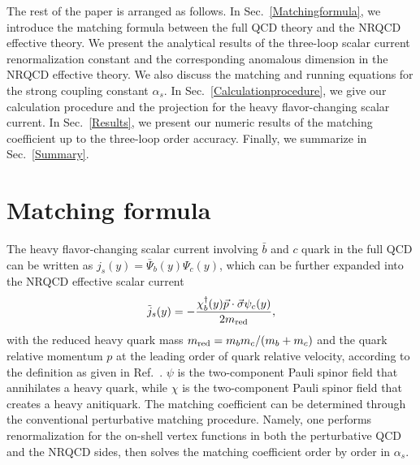 \documentclass[onecolumn,preprintnumbers,aps,superscriptaddress,nofootinbib,prd,notitlepage]{revtex4-1}
\newcommand{\beq}{\begin{eqnarray}}
\newcommand{\eeq}{\end{eqnarray}}
\begin{document}
The rest of the paper is arranged as follows.
In Sec.~\ref{Matchingformula}, we introduce the matching formula between the full QCD theory and the NRQCD effective theory.  We  present the analytical results of  the three-loop  scalar current renormalization constant and the corresponding anomalous dimension in the NRQCD effective theory. We also discuss the matching and running equations for the strong coupling constant $\alpha_{s}$.
In Sec.~\ref{Calculationprocedure},  we give our calculation procedure and the projection for the heavy flavor-changing scalar current.
In Sec.~\ref{Results}, we present our numeric results of the matching coefficient up to the three-loop order accuracy. Finally, we summarize  in Sec.~\ref{Summary}.



\section{Matching formula ~\label{Matchingformula}}

The heavy flavor-changing scalar current involving $\bar{b}$ and $c$ quark in the full QCD can be written as $j_s(y)=\bar{\Psi}_b(y) \Psi_c(y)$, which can be further expanded into the NRQCD effective scalar current
\beq
\tilde{j}_s(y)=-\frac{\chi^\dag_b(y) \vec{p}\cdot \vec{\sigma}\psi_c(y)}{2m_{\rm red}},
\eeq
with the reduced heavy quark mass $m_{\rm red}=m_b m_c/(m_b+m_c)$ and the quark relative momentum $p$ at the leading order of quark relative velocity, according
to the definition as given  in Ref.~\cite{Kniehl:2006qw}. $\psi$ is the two-component Pauli spinor field that annihilates a heavy quark, while $\chi$ is the two-component Pauli
spinor field that creates a heavy anitiquark.
The matching coefficient can be determined through the conventional perturbative matching procedure. Namely, one  performs renormalization for  the on-shell vertex functions in both the perturbative QCD and the
NRQCD sides, then solves the matching coefficient  order by order in $\alpha_s$.
\end{document}
